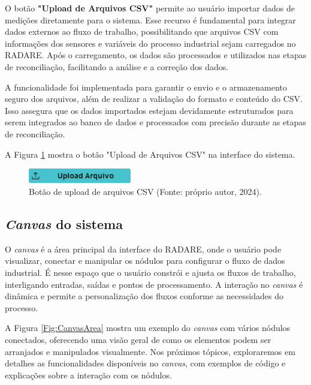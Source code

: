 O botão \textbf{"Upload de Arquivos CSV"} permite ao usuário importar dados de medições diretamente para o sistema. Esse recurso é fundamental para integrar dados externos ao fluxo de trabalho, possibilitando que arquivos CSV com informações dos sensores e variáveis do processo industrial sejam carregados no RADARE. Após o carregamento, os dados são processados e utilizados nas etapas de reconciliação, facilitando a análise e a correção dos dados.

A funcionalidade foi implementada para garantir o envio e o armazenamento seguro dos arquivos, além de realizar a validação do formato e conteúdo do CSV. Isso assegura que os dados importados estejam devidamente estruturados para serem integrados ao banco de dados e processados com precisão durante as etapas de reconciliação.

A Figura \ref{Fig:UploadCSVButton} mostra o botão "Upload de Arquivos CSV" na interface do sistema.

\begin{figure}[htbp]
    \centering
    \includegraphics[width=0.4\textwidth]{figuras/upload-csv-button.png}
    \caption{Botão de upload de arquivos CSV (Fonte: próprio autor, 2024).}
    \label{Fig:UploadCSVButton}
\end{figure}

\subsection{\textit{Canvas} do sistema}

O \textit{canvas} é a área principal da interface do RADARE, onde o usuário pode visualizar, conectar e manipular os nódulos para configurar o fluxo de dados industrial. É nesse espaço que o usuário constrói e ajusta os fluxos de trabalho, interligando entradas, saídas e pontos de processamento. A interação no \textit{canvas} é dinâmica e permite a personalização dos fluxos conforme as necessidades do processo.

A Figura \ref{Fig:CanvasArea} mostra um exemplo do \textit{canvas} com vários nódulos conectados, oferecendo uma visão geral de como os elementos podem ser arranjados e manipulados visualmente. Nos próximos tópicos, exploraremos em detalhes as funcionalidades disponíveis no \textit{canvas}, com exemplos de código e explicações sobre a interação com os nódulos.

